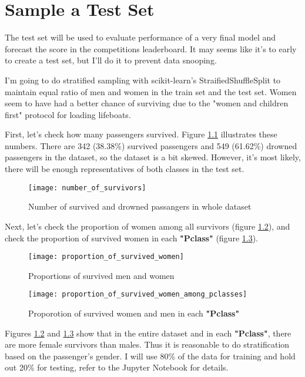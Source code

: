 \chapter{Sample a Test Set} \label{chapter:sample_test_set}
The test set will be used to evaluate performance of a very final model
and forecast the score in the competitions leaderboard. It may seems like
it's to early to create a test set, but I'll do it to prevent data snooping.

I'm going to do stratified sampling with scikit-learn's StraifiedShuffleSplit
to maintain equal ratio of men and women in the train set and the test set.
Women seem to have had a better chance of surviving due to the "women and
children first" protocol for loading lifeboats.

First, let's check how many passengers survived. Figure 
\ref{number_of_survivors} illustrates these numbers. There are 342 (38.38\%)
survived passengers and 549 (61.62\%) drowned passengers in the dataset, 
so the dataset is a bit skewed. However, it's most likely, there will be 
enough representatives of both classes in the test set.

\begin{figure}[!ht]
	\centering
	\texttt{[image: number\_of\_survivors]}
	\caption{Number of survived and drowned passangers in whole dataset}
	\label{number_of_survivors}
\end{figure}

Next, let's check the proportion of women among all survivors (figure
\ref{proportion_of_survived_women}), and check the proportion of survived
women in each \textbf{"Pclass"} (figure 
\ref{proportion_of_survived_women_among_pclasses}).

\begin{figure}[!ht]
	\centering
	\texttt{[image: proportion\_of\_survived\_women]}
	\caption{Proportions of survived men and women}
	\label{proportion_of_survived_women}
\end{figure}

\begin{figure}[!ht]
	\centering
	\texttt{[image: proportion\_of\_survived\_women\_among\_pclasses]}
	\caption{Proporotion of survived women and men in each \textbf{"Pclass"}}
	\label{proportion_of_survived_women_among_pclasses}
\end{figure}

Figures \ref{proportion_of_survived_women} and 
\ref{proportion_of_survived_women_among_pclasses} show that in the entire 
dataset and in each \textbf{"Pclass"}, there are more female survivors 
than males. Thus it is reasonable to do stratification based on the
passenger's gender. I will use 80\% of the data for training and hold 
out 20\% for testing, refer to the Jupyter Notebook for details.